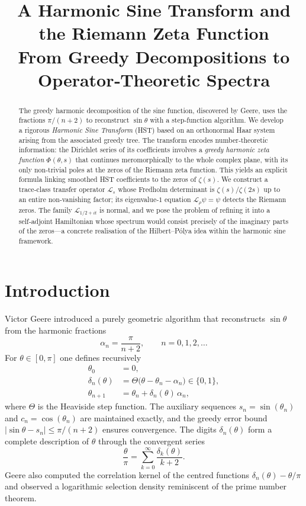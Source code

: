 \documentclass[11pt,a4paper]{article}
\title{\bfseries A Harmonic Sine Transform and the Riemann Zeta Function\\
\large From Greedy Decompositions to Operator‑Theoretic Spectra}
\author{}
\date{}
\theoremstyle{remark}
\begin{document}
\maketitle

\begin{abstract}
The greedy harmonic decomposition of the sine function, discovered by Geere, uses the fractions \(\pi/(n+2)\) to reconstruct \(\sin\theta\) with a step‑function algorithm. We develop a rigorous \emph{Harmonic Sine Transform} (HST) based on an orthonormal Haar system arising from the associated greedy tree. The transform encodes number‑theoretic information: the Dirichlet series of its coefficients involves a \emph{greedy harmonic zeta function} \(\Phi(\theta,s)\) that continues meromorphically to the whole complex plane, with its only non‑trivial poles at the zeros of the Riemann zeta function. This yields an explicit formula linking smoothed HST coefficients to the zeros of \(\zeta(s)\). We construct a trace‑class transfer operator \(\mathcal{L}_s\) whose Fredholm determinant is \(\zeta(s)/\zeta(2s)\) up to an entire non‑vanishing factor; its eigenvalue‑\(1\) equation \(\mathcal{L}_\rho\psi=\psi\) detects the Riemann zeros. The family \(\mathcal{L}_{1/2+it}\) is normal, and we pose the problem of refining it into a self‑adjoint Hamiltonian whose spectrum would consist precisely of the imaginary parts of the zeros—a concrete realisation of the Hilbert–Pólya idea within the harmonic sine framework.
\end{abstract}

\tableofcontents

\section{Introduction}
Victor Geere \cite{Geere2026a,Geere2026b} introduced a purely geometric algorithm that reconstructs \(\sin\theta\) from the harmonic fractions
\[
\alpha_n=\frac{\pi}{n+2},\qquad n=0,1,2,\dots
\]
For \(\theta\in[0,\pi]\) one defines recursively
\begin{equation}\label{eq:greedy}
\begin{aligned}
\theta_0&=0,\\
\delta_n(\theta)&=\Theta\bigl(\theta-\theta_n-\alpha_n\bigr)\in\{0,1\},\\
\theta_{n+1}&=\theta_n+\delta_n(\theta)\,\alpha_n,
\end{aligned}
\end{equation}
where \(\Theta\) is the Heaviside step function. The auxiliary sequences \(s_n=\sin(\theta_n)\) and \(c_n=\cos(\theta_n)\) are maintained exactly, and the greedy error bound \(|\sin\theta-s_n|\le\pi/(n+2)\) ensures convergence. The digits \(\delta_n(\theta)\) form a complete description of \(\theta\) through the convergent series
\begin{equation}\label{eq:expansion}
\frac{\theta}{\pi}=\sum_{k=0}^{\infty}\frac{\delta_k(\theta)}{k+2}.
\end{equation}
Geere also computed the correlation kernel of the centred functions \(\delta_n(\theta)-\theta/\pi\) and observed a logarithmic selection density reminiscent of the prime number theorem.
\end{document}
